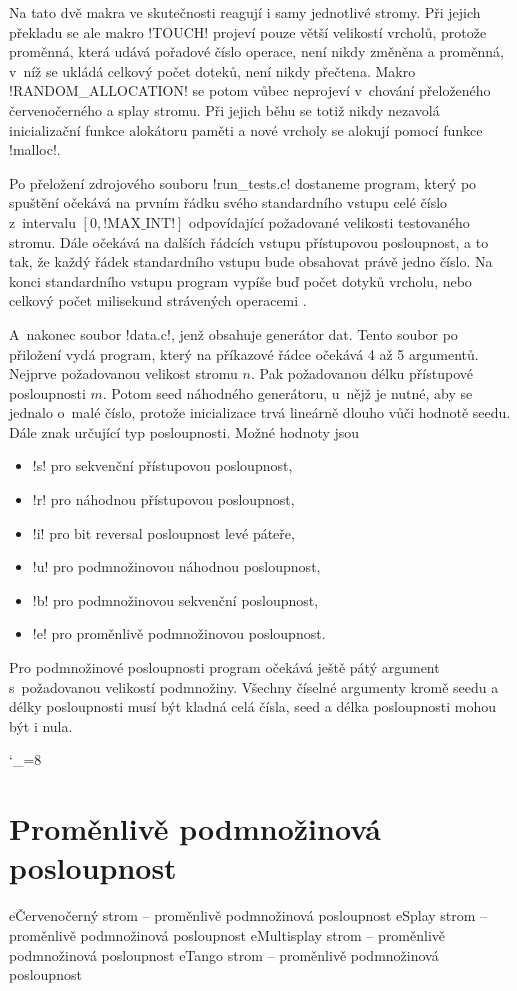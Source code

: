 Na tato dvě makra ve skutečnosti reagují i samy jednotlivé stromy. Při jejich
překladu se ale makro !TOUCH! projeví pouze větší velikostí vrcholů, protože
proměnná, která udává pořadové číslo operace, není nikdy změněna a proměnná,
v~níž se ukládá celkový počet doteků, není nikdy přečtena. Makro
!RANDOM_ALLOCATION! se potom vůbec neprojeví v~chování přeloženého
červenočerného a splay stromu. Při jejich běhu se totiž nikdy nezavolá
inicializační funkce alokátoru paměti a nové vrcholy se alokují pomocí funkce
!malloc!.

Po přeložení zdrojového souboru !run_tests.c! dostaneme program, který po
spuštění očekává na prvním řádku svého standardního vstupu celé číslo
z~intervalu $[0, \text{!MAX_INT!}]$ odpovídající požadované velikosti testovaného stromu. Dále
očekává na dalších řádcích vstupu přístupovou posloupnost, a to tak, že každý
řádek standardního vstupu bude obsahovat právě jedno číslo. Na konci
standardního vstupu program vypíše buď počet dotyků vrcholu, nebo celkový
počet milisekund strávených operacemi .

A~nakonec soubor !data.c!, jenž obsahuje generátor dat. Tento soubor po přiložení vydá program, který na příkazové řádce očekává 4 až 5 argumentů. Nejprve požadovanou velikost stromu $n$. Pak požadovanou délku přístupové posloupnosti $m$. Potom seed náhodného generátoru, u~nějž je nutné, aby se jednalo o~malé číslo, protože inicializace trvá lineárně dlouho vůči hodnotě seedu. Dále znak určující typ posloupnosti. Možné hodnoty jsou

\begin{itemize}
\item !s! pro sekvenční přístupovou posloupnost,
\item !r! pro náhodnou přístupovou posloupnost,
\item !i! pro bit reversal posloupnost levé páteře,
\item !u! pro podmnožinovou náhodnou posloupnost,
\item !b! pro podmnožinovou sekvenční posloupnost,
\item !e! pro proměnlivě podmnožinovou posloupnost.
\end{itemize}

Pro podmnožinové posloupnosti program očekává ještě pátý argument s~požadovanou velikostí podmnožiny. Všechny číselné argumenty kromě seedu a délky posloupnosti musí být kladná celá čísla, seed a délka posloupnosti mohou být i nula.

\catcode`_=8

\openright
\section{Proměnlivě podmnožinová posloupnost}\label{sec:app2}
{\def\dira#1{}
e{Červenočerný strom -- proměnlivě podmnožinová posloupnost}
}
e{Splay strom -- proměnlivě podmnožinová posloupnost}
e{Multisplay strom -- proměnlivě podmnožinová posloupnost}
e{Tango strom -- proměnlivě podmnožinová posloupnost}

